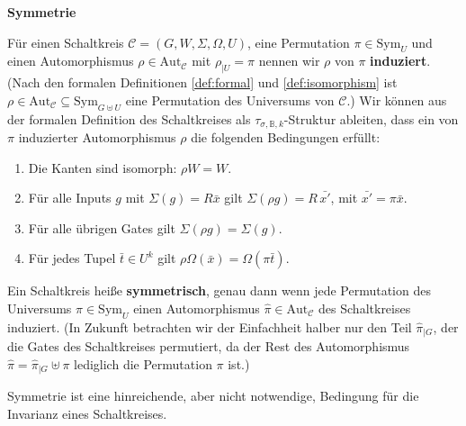 \begin{defn}
\textbf{Symmetrie}

Für einen Schaltkreis $\mathcal{C}=\left(G,W,\Sigma,\Omega,U\right)$,
eine Permutation $\pi\in\mathrm{Sym}_{U}$ und einen Automorphismus
$\rho\in\mathrm{Aut}_{\mathcal{C}}$ mit $\rho_{\mid U}=\pi$ nennen
wir $\rho$ von $\pi$ \textbf{induziert}. (Nach den formalen Definitionen
\ref{def:formal} und \ref{def:isomorphism} ist $\rho\in\mathrm{Aut}_{\mathcal{C}}\subseteq\mathrm{Sym}_{G\uplus U}$
eine Permutation des Universums von $\mathcal{C}$.) Wir können aus
der formalen Definition des Schaltkreises als $\tau_{\sigma,\mathbb{B},k}$-Struktur
ableiten, dass ein von $\pi$ induzierter Automorphismus $\rho$ die
folgenden Bedingungen erfüllt:

\begin{enumerate}
\item Die Kanten sind isomorph: $\rho W=W$.
\item Für alle Inputs $g$ mit $\Sigma\left(g\right)=R\bar{x}$ gilt $\Sigma\left(\rho g\right)=R\,\bar{x'}$,
mit $\bar{x'}=\pi\bar{x}$.
\item Für alle übrigen Gates gilt $\Sigma\left(\rho g\right)=\Sigma\left(g\right)$.
\item Für jedes Tupel $\bar{t}\in U^{k}$ gilt $\rho\Omega\left(\bar{x}\right)=\Omega\left(\pi\bar{t}\right)$.
\end{enumerate}
Ein Schaltkreis heiße \textbf{symmetrisch}, genau dann wenn jede Permutation
des Universums $\pi\in\mathrm{Sym}_{U}$ einen Automorphismus $\hat{\pi}\in\mathrm{Aut}_{\mathcal{C}}$
des Schaltkreises induziert. (In Zukunft betrachten wir der Einfachheit
halber nur den Teil $\hat{\pi}_{\mid G}$, der die Gates des Schaltkreises
permutiert, da der Rest des Automorphismus $\hat{\pi}=\hat{\pi}_{\mid G}\uplus\pi$
lediglich die Permutation $\pi$ ist.)
\end{defn}
\begin{prop}
Symmetrie ist eine hinreichende, aber nicht notwendige, Bedingung
für die Invarianz eines Schaltkreises.
\end{prop}
